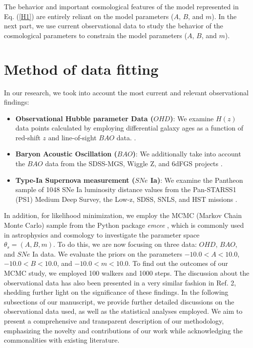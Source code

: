 \documentclass[prd,superscriptaddress,amsfonts,amssymb,amsmath,showpacs,twocolumn]{revtex4-2}
\begin{document}
The behavior and important cosmological features of the model represented in
Eq. (\ref{H1}) are entirely reliant on the model parameters ($A$, $B$, and $m
$). In the next part, we use current observational data to study the
behavior of the cosmological parameters to constrain the model parameters ($A
$, $B$, and $m$).

\section{Method of data fitting}
\label{sec4}

In our research, we took into account the most current and relevant
observational findings:

\begin{itemize}
\item \textbf{Observational Hubble parameter Data ($OHD$)}: We examine $H(z)$ data
points calculated by employing differential galaxy ages as a function of
red-shift $z$ and line-of-sight $BAO$ data. \cite%
{Yu/2018,Moresco/2015,Sharov/2018}.

\item \textbf{Baryon Acoustic Oscillation ($BAO$)}: We additionally take into
account the $BAO$ data from the SDSS-MGS, Wiggle Z, and 6dFGS projects \cite%
{Blake/2011,Percival/2010,Giostri/2012}.

\item \textbf{Type-Ia Supernova measurement ($SNe$ Ia)}: We examine the
Pantheon sample of 1048 SNe Ia luminosity distance values from the
Pan-STARSS1 (PS1) Medium Deep Survey, the Low-z, SDSS, SNLS, and HST
missions \cite{Scolnic/2018,Chang/2019}.
\end{itemize}

In addition, for likelihood minimization, we employ the MCMC (Markov Chain Monte
Carlo) sample from the Python package \textit{emcee} \cite{Mackey/2013}%
, which is commonly used in astrophysics and cosmology to investigate the
parameter space $\theta_{s}=(A, B, m)$. To do this, we are now focusing on
three data: $OHD$, $BAO$, and $SNe$ Ia data. We evaluate the priors on the
parameters $-10.0<A<10.0$, $-10.0<B<10.0$, and $-10.0<m<10.0$. To find out the
outcomes of our MCMC study, we employed 100 walkers and 1000 steps. The discussion about the observational data has also been presented in a very similar fashion in Ref. 2, shedding further light on the significance of these findings. In the following subsections of our manuscript, we provide further detailed discussions on the observational data used, as well as the statistical analyses employed. We aim to present a comprehensive and transparent description of our methodology, emphasizing the novelty and contributions of our work while acknowledging the commonalities with existing literature.
\end{document}
